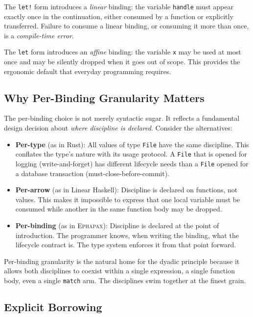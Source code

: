 \documentclass[11pt,a4paper]{article}
\newcommand{\Ephapax}{\textsc{Ephapax}}
\begin{document}
The \lstinline{let!} form introduces a \emph{linear} binding: the variable
\lstinline{handle} must appear exactly once in the continuation, either consumed
by a function or explicitly transferred. Failure to consume a linear binding, or
consuming it more than once, is a \emph{compile-time error}.

The \lstinline{let} form introduces an \emph{affine} binding: the variable
\lstinline{x} may be used at most once and may be silently dropped when it goes
out of scope. This provides the ergonomic default that everyday programming
requires.

\subsection{Why Per-Binding Granularity Matters}

The per-binding choice is not merely syntactic sugar. It reflects a fundamental
design decision about \emph{where discipline is declared}. Consider the
alternatives:

\begin{itemize}
  \item \textbf{Per-type} (as in Rust): All values of type \lstinline{File}
    have the same discipline. This conflates the type's nature with its usage
    protocol. A \lstinline{File} that is opened for logging (write-and-forget)
    has different lifecycle needs than a \lstinline{File} opened for a database
    transaction (must-close-before-commit).

  \item \textbf{Per-arrow} (as in Linear Haskell): Discipline is declared on
    functions, not values. This makes it impossible to express that one local
    variable must be consumed while another in the same function body may be
    dropped.

  \item \textbf{Per-binding} (as in \Ephapax{}): Discipline is declared at the
    point of introduction. The programmer knows, when writing the binding, what
    the lifecycle contract is. The type system enforces it from that point forward.
\end{itemize}

Per-binding granularity is the natural home for the dyadic principle because
it allows both disciplines to coexist within a single expression, a single
function body, even a single \lstinline{match} arm. The disciplines swim
together at the finest grain.

\subsection{Explicit Borrowing}
\end{document}
